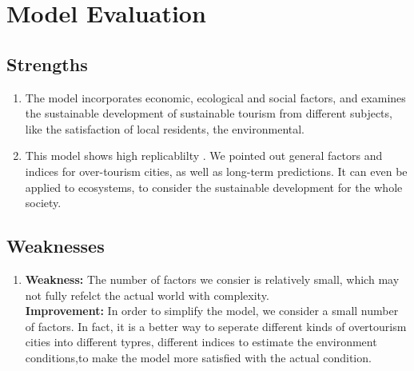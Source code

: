 \documentclass[UTF8]{mcmthesis}
\begin{document}
    \section{Model Evaluation}
        \subsection{Strengths}
        \begin{enumerate}
\item The model incorporates economic, ecological and social factors, and examines the  sustainable development of sustainable tourism from different subjects, like the satisfaction of local residents, the environmental.
																																																																																				
\item This model shows high replicablilty . We pointed out general factors and indices for over-tourism cities, as well as long-term predictions. It can even be applied to ecosystems, to consider the sustainable development for the whole society.
\end{enumerate}

            
        \subsection{Weaknesses}
            \begin{enumerate}
                \item \textbf{Weakness: }The number of factors we consier is relatively small, which may not fully refelct the actual world with complexity.\\
                \hspace*{2em} \textbf{Improvement:} In order to simplify the model, we consider a small number of factors. In fact, it is a better way to seperate different kinds of overtourism cities into different typres, different indices to estimate the environment conditions,to make the model more satisfied with the actual condition.
            \end{enumerate}
\end{document}
